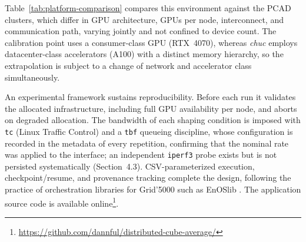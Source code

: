 \documentclass[12pt]{article}
\begin{document}
Table~\ref{tab:platform-comparison} compares this environment against the PCAD clusters, which differ in GPU architecture, GPUs per node, interconnect, and communication path, varying jointly and not confined to device count. The calibration point uses a consumer-class GPU (RTX~4070), whereas \textit{chuc} employs datacenter-class accelerators (A100) with a distinct memory hierarchy, so the extrapolation is subject to a change of network and accelerator class simultaneously.

\begin{table}[tb]
  \centering
  \small
  \caption{Hardware environments of the prior study's physical evaluation and of this work.}
  \label{tab:platform-comparison}
\end{table}
 
An experimental framework sustains reproducibility. Before each run it validates the allocated infrastructure, including full GPU availability per node, and aborts on degraded allocation. The bandwidth of each shaping condition is imposed with \texttt{tc} (Linux Traffic Control) and a \texttt{tbf} queueing discipline, whose configuration is recorded in the metadata of every repetition, confirming that the nominal rate was applied to the interface; an independent \texttt{iperf3} probe exists but is not persisted systematically (Section~4.3). CSV-parameterized execution, checkpoint/resume, and provenance tracking complete the design, following the practice of orchestration libraries for Grid'5000 such as EnOSlib \cite{cherrueau2022enoslib}. The application source code is available online\footnote{\url{https://github.com/dannful/distributed-cube-average/}}.
 
\end{document}
